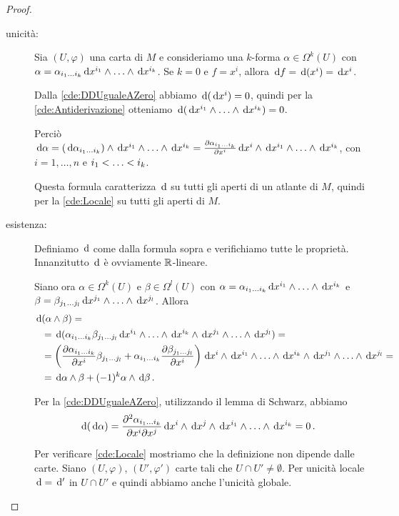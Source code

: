 \begin{proof}
	\begin{description}
		\item [unicità:] Sia $(U,\varphi)$ una carta di $M$ e consideriamo una $k$-forma $\alpha\in\Omega^k(U)$ con $\alpha = \alpha_{\seqb ik{}} \de x^{i_1} \wedge \ldots \wedge \de x^{i_k}$.
		Se $k=0$ e $f=x^i$, allora $\de f = \de(x^i) = \de x^i$.
		
		Dalla \ref{cde:DDUgualeAZero} abbiamo $\de(\de x^i) = 0$, quindi per la \ref{cde:Antiderivazione} otteniamo $\de(\de x^{i_1} \wedge \ldots \wedge \de x^{i_k}) = 0$.
		
		Perciò $\de\alpha = (\de \alpha_{\seqb ik{}}) \wedge \de x^{i_1} \wedge \ldots\wedge \de x^{i_k} = \DerParz{\alpha_{\seqb ik{}}} {x^i} \de x^i \wedge \de x^{i_1} \wedge\ldots \wedge \de x^{i_k}$, con $i=1,\ldots,n$ e $\seqb ik<$.
		
		Questa formula caratterizza $\de$ su tutti gli aperti di un atlante di $M$, quindi per la \ref{cde:Locale} su tutti gli aperti di $M$.
		
		\item [esistenza:] Definiamo $\de$ come dalla formula sopra e verifichiamo tutte le proprietà. Innanzitutto $\de$ è ovviamente $\R$-lineare.
		
		Siano ora $\alpha\in\Omega^k(U)$ e $\beta\in\Omega^l(U)$ con $\alpha = \alpha_{\seqb ik{}} \de x^{i_1} \wedge \ldots \wedge \de x^{i_k}$ e $\beta= \beta_{\seqb jl{}} \de x^{j_1} \wedge\ldots\wedge \de x^{j_l}$. Allora
		\begin{align*}
			\de& (\alpha \wedge \beta) =\\ 
			&= \de (\alpha_{\seqb ik{}} \beta_{\seqb jl{}} \de x^{i_1} \wedge\ldots\wedge \de x^{i_k}\wedge \de x^{j_1} \wedge\ldots\wedge \de x^{j_l}) =\\
			&= \left(\DerParz{\alpha_{\seqb ik{}}}{x^i} \beta_{\seqb jl{}} + \alpha_{\seqb ik{}} \DerParz{\beta_{\seqb jl{}}}{x^i} \right) \de x^i\wedge\de x^{i_1} \wedge\ldots\wedge \de x^{i_k}\wedge \de x^{j_1} \wedge\ldots\wedge \de x^{j_l} = \\
			&=\de \alpha \wedge \beta + (-1)^k \alpha \wedge \de \beta \punto
		\end{align*}
		
		Per la \ref{cde:DDUgualeAZero}, utilizzando il lemma di Schwarz, abbiamo
		\begin{equation*}
		\de(\de\alpha) = \frac{\partial^2 \alpha_{\seqb ik{}}}{\partial x^i \partial x^j} \de x^i\wedge\de x^j \wedge\de x^{i_1} \wedge\ldots\wedge \de x^{i_k} =0 \punto
		\end{equation*}
		
		Per verificare \ref{cde:Locale} mostriamo che la definizione non dipende dalle carte. Siano $(U,\varphi)$, $(U',\varphi')$ carte tali che $U\cap U' \not=\emptyset$. Per unicità locale $\de = \de'$ in $U\cap U'$ e quindi abbiamo anche l'unicità globale.
	\end{description}
\end{proof}


